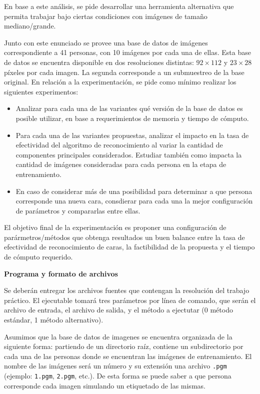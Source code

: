 \documentclass[11pt, a4paper]{article}
\begin{document}
En base a este an\'alisis, se pide desarrollar una herramienta alternativa que permita trabajar bajo ciertas condiciones
con im\'agenes de tama\~no mediano/grande.

Junto con este enunciado se provee una base de datos de im\'agenes correspondiente a 41 personas, con 10
im\'agenes por cada una de ellas. Esta base de datos se encuentra disponible en dos resoluciones distintas: $92 \times
112$ y $23 \times 28$ p\'ixeles por cada imagen. La segunda corresponde a un submuestreo de la base original.
En relaci\'on a la experimentaci\'on, se pide como m\'inimo realizar los siguientes experimentos:
\begin{itemize}
\item Analizar para cada una de las variantes qu\'e versi\'on de la base de datos es posible utilizar, en base a
requerimientos de memoria y tiempo de c\'omputo.

\item Para cada una de las variantes propuestas, analizar el impacto en la tasa de efectividad del algoritmo de reconocimiento al
variar la cantidad de componentes principales considerados. Estudiar tambi\'en como impacta la cantidad de im\'agenes
consideradas para cada persona en la etapa de entrenamiento.

\item En caso de considerar m\'as de una posibilidad para determinar a que persona corresponde una nueva cara,
consdierar para cada una la mejor configuraci\'on de par\'ametros y compararlas entre ellas.
\end{itemize}

El objetivo final de la experimentaci\'on es proponer una configuraci\'on de par\'armetros/m\'etodos que obtenga
resultados un buen balance entre la tasa de efectividad de reconocimiento de caras, la factibilidad de la propuesta y el
tiempo de c\'omputo requerido.

{\bf Programa y formato de archivos}

Se deber\'an entregar los archivos fuentes que contengan la resoluci\'on del trabajo pr\'actico. El ejecutable tomar\'a
tres par\'ametros por l\'inea de comando, que ser\'an el archivo de entrada, el archivo de salida, y el m\'etodo a
ejectutar (0 m\'etodo est\'andar, 1 m\'etodo alternativo).


Asumimos que la base de datos de imagenes se encuentra organizada de la siguiente forma: partiendo de un directorio
ra\'iz, contiene un subdirectorio por cada una de las personas donde se encuentran las im\'agenes de entrenamiento. El
nombre de las im\'agenes ser\'a un n\'umero y su extensi\'on una archivo \verb+.pgm+ (ejemplo: \verb+1.pgm+,
\verb+2.pgm+, etc.). De esta forma se puede saber a que persona corresponde cada imagen simulando un etiquetado de las
mismas. 
\end{document}
